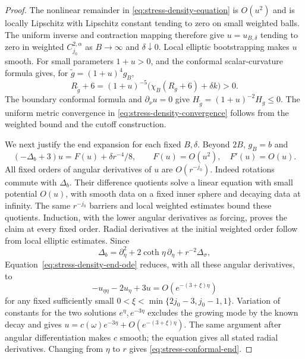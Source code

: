 \begin{proof}
The nonlinear remainder in \eqref{eq:stress-density-equation} is
$O(u^2)$ and is locally Lipschitz with Lipschitz constant tending to zero
on small weighted balls.  The uniform inverse and contraction mapping
therefore give $u=u_{B,\delta}$ tending to zero in weighted
$C^{2,\alpha}_{j_0}$ as $B\to\infty$ and $\delta\downarrow0$.
Local elliptic bootstrapping makes $u$ smooth.  For small parameters
$1+u>0$, and the conformal scalar-curvature formula gives, for
$\widetilde g=(1+u)^4g_B$,
\begin{equation}
 R_{\widetilde g}+6
 =(1+u)^{-5}\big(\chi_B(R_g+6)+\delta k\big)>0.
 \label{eq:stress-density-scalar}
\end{equation}
The boundary conformal formula and $\partial_\nu u=0$ give
$H_{\widetilde g}=(1+u)^{-2}H_g\le0$.  The uniform metric convergence in
\eqref{eq:stress-density-convergence} follows from the weighted bound and
the cutoff construction.

We next justify the end expansion for each fixed $B,\delta$.
Beyond $2B$, $g_B=b$ and
\begin{equation}
 (-\Delta_b+3)u=F(u)+\delta r^{-4}/8,
 \qquad F(u)=O(u^2),\quad F'(u)=O(u).
 \label{eq:stress-density-end-ode}
\end{equation}
All fixed orders of angular derivatives of $u$ are $O(r^{-j_0})$.
Indeed rotations commute with $\Delta_b$.  Their difference quotients
solve a linear equation with small potential $O(u)$, with smooth data
on a fixed inner sphere and decaying data at infinity.  The same
$r^{-j_0}$ barriers and local weighted estimates bound these quotients.
Induction, with the lower angular derivatives as forcing, proves the
claim at every fixed order.  Radial derivatives at the initial weighted
order follow from local elliptic estimates.  Since
\[
 \Delta_b=\partial_\eta^2+2\coth\eta\,\partial_\eta
            +r^{-2}\Delta_\sigma,
\]
Equation~\eqref{eq:stress-density-end-ode} reduces, with all these angular
derivatives, to
\[
 -u_{\eta\eta}-2u_\eta+3u=O(e^{-(3+\xi)\eta})
\]
for any fixed sufficiently small
$0<\xi<\min\{2j_0-3,j_0-1,1\}$.  Variation of constants for the two
solutions $e^\eta,e^{-3\eta}$ excludes the growing mode by the known
decay and gives $u=c(\omega)e^{-3\eta}+O(e^{-(3+\xi)\eta})$.
The same argument after angular differentiation makes $c$ smooth;
the equation gives all stated radial derivatives.  Changing from
$\eta$ to $r$ gives \eqref{eq:stress-conformal-end}.


\end{proof}
